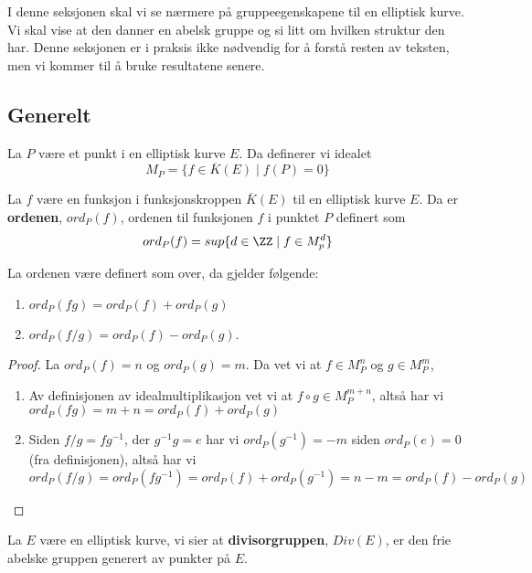 I denne seksjonen skal vi se nærmere på gruppeegenskapene til en elliptisk kurve. Vi skal vise at den danner en abelsk gruppe og si litt om hvilken struktur den har. Denne seksjonen er i praksis ikke nødvendig for å forstå resten av teksten, men vi kommer til å bruke resultatene senere.

\subsection{Generelt}
\begin{definisjon}
La $P$ være et punkt i en elliptisk kurve $E$. Da definerer vi idealet $$M_P = \{f \in \overline{K}(E) \mid f(P) = 0 \}$$
\end{definisjon}

\begin{definisjon}
La $f$ være en funksjon i funksjonskroppen $\overline{K}(E)$ til en elliptisk kurve $E$. Da er \textbf{ordenen}, $ord_P(f)$, ordenen til funksjonen $f$ i punktet $P$ definert som $$ord_P(f) = sup\{d \in \ZZ \mid f \in M_p^d\}$$
\end{definisjon}

\begin{proposisjon}
La ordenen være definert som over, da gjelder følgende:
\begin{enumerate}
\item $ord_P(fg) = ord_P(f) + ord_P(g)$
\item $ord_P(f/g) = ord_P(f) - ord_P(g)$.
\end{enumerate}

\begin{proof}
La $ord_P(f) = n$ og $ord_P(g) = m$. Da vet vi at $f \in M_P^n$ og $g \in M_P^m$,
\begin{enumerate}
\item  Av definisjonen av idealmultiplikasjon vet vi at $f \circ g \in M_P^{m+n}$, altså har vi $ord_P(fg) = m + n = ord_P(f) + ord_P(g)$
\item Siden $f/g = fg^{-1}$, der $g^{-1}g = e$ har vi $ord_P(g^{-1}) = -m$ siden $ord_P(e) = 0$ (fra definisjonen), altså har vi $ord_P(f/g) = ord_P(fg^{-1}) = ord_P(f) + ord_P(g^{-1}) = n - m = ord_P(f) - ord_P(g)$
\end{enumerate}
\end{proof}
\end{proposisjon}

\begin{definisjon}
La $E$ være en elliptisk kurve, vi sier at \textbf{divisorgruppen}, $Div(E)$, er den frie abelske gruppen generert av punkter på $E$. 
\end{definisjon}

